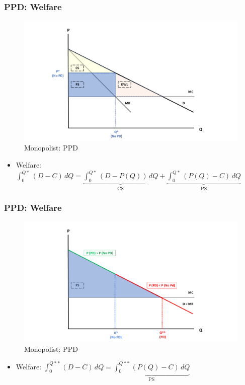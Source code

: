 \documentclass[10pt]{beamer}
\begin{document}
\begin{frame} 
	\frametitle{PPD: Welfare}
	

	\begin{figure}[H]
		\centering
		\includegraphics[width=0.8\linewidth]{no_pd_welf}
		\caption{Monopolist: PPD \\ 
			\label{fig:ppd}}
		
	\end{figure}
	
	\begin{itemize}
		\item Welfare: $\int_{0}^{Q*} (D - C) \,dQ = \underbrace{\int_{0}^{Q*} (D - P(Q)) \,dQ}_\text{CS} + \underbrace{\int_{0}^{Q*} (P(Q) - C)\,dQ }_\text{PS}$
	\end{itemize}
	
	
\end{frame}

\begin{frame} 
	\frametitle{PPD: Welfare}
	
	
	\begin{figure}[H]
		\centering
		\includegraphics[width=0.8\linewidth]{pd_welf}
		\caption{Monopolist: PPD \\ 
			\label{fig:ppd}}
		
	\end{figure}
	
	\begin{itemize}
	\item Welfare: $\int_{0}^{Q**} (D - C) \,dQ = \underbrace{\int_{0}^{Q**} (P(Q) - C)\,dQ }_\text{PS}$
\end{itemize}
	
	
\end{frame}
\end{document}
